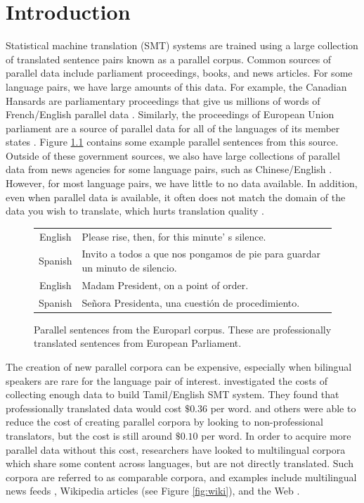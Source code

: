 \chapter{Introduction}
\label{chap:intro}

Statistical machine translation (SMT) systems are trained using a large collection of translated
sentence pairs known as a parallel corpus. Common sources of parallel data include
parliament proceedings, books, and news articles.
For some language pairs, we have large amounts of this data. For example, the Canadian
Hansards are parliamentary proceedings that give us millions of words of
French/English parallel data \citep{Germann01}. Similarly, the proceedings of
European Union parliament are a source of parallel data for all of the languages
of its member states \citep{Koehn05}. Figure \ref{fig:europarl} contains some
example parallel sentences from this source. Outside of these government sources, we
also have large collections of parallel data from news agencies for some
language pairs, such as Chinese/English \citep{Ma05}.
However, for most language pairs, we have little to no data available.
In addition, even when parallel
data is available, it often does not match the domain of the data you wish to
translate, which hurts translation quality \citep{Munteanu05}.

\begin{figure}[ht]
\begin{tabular}{|c|l|}
\hline
English & Please rise, then, for this minute' s silence. \\
Spanish & Invito a todos a que nos pongamos de pie para guardar un minuto de
silencio. \\
\hline
English & Madam President, on a point of order. \\
Spanish & Señora Presidenta, una cuestión de procedimiento. \\
\hline
\end{tabular}
\caption{Parallel sentences from the Europarl corpus. These are professionally
translated sentences from European Parliament.}
\label{fig:europarl}
\end{figure}

The creation of new parallel corpora can be expensive, especially when bilingual
speakers are rare for the language pair of interest. \citet{Germann01a}
investigated the costs of collecting enough data to build Tamil/English SMT
system. They found that professionally translated data would cost $\$0.36$ per
word. \citet{Germann01a} and others \citep{Zaidan11} were able to reduce the
cost of creating parallel corpora by looking to non-professional translators,
but the cost is still around $\$0.10$ per word.
In order to acquire more parallel data without this cost,
researchers have looked to multilingual corpora which share some content across languages,
but are not directly translated. Such corpora are referred to as comparable
corpora, and examples include multilingual news feeds \citep{Munteanu05},
Wikipedia articles \citep{Adafre06,Smith10} (see Figure \ref{fig:wiki}), and the Web
\citep{Resnik99,Nie99,Chen00}. 

